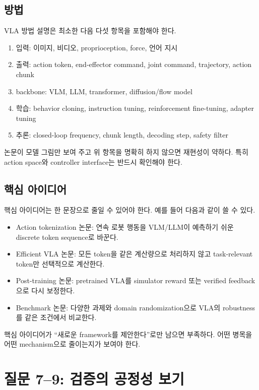 \subsection{방법}

VLA 방법 설명은 최소한 다음 다섯 항목을 포함해야 한다.

\begin{enumerate}
  \item 입력: 이미지, 비디오, proprioception, force, 언어 지시
  \item 출력: action token, end-effector command, joint command, trajectory, action chunk
  \item backbone: VLM, LLM, transformer, diffusion/flow model
  \item 학습: behavior cloning, instruction tuning, reinforcement fine-tuning, adapter tuning
  \item 추론: closed-loop frequency, chunk length, decoding step, safety filter
\end{enumerate}

논문이 모델 그림만 보여 주고 위 항목을 명확히 하지 않으면 재현성이 약하다. 특히 action space와 controller interface는 반드시 확인해야 한다.

\subsection{핵심 아이디어}

핵심 아이디어는 한 문장으로 줄일 수 있어야 한다. 예를 들어 다음과 같이 쓸 수 있다.

\begin{itemize}
  \item Action tokenization 논문: 연속 로봇 행동을 VLM/LLM이 예측하기 쉬운 discrete token sequence로 바꾼다.
  \item Efficient VLA 논문: 모든 token을 같은 계산량으로 처리하지 않고 task-relevant token만 선택적으로 계산한다.
  \item Post-training 논문: pretrained VLA를 simulator reward 또는 verified feedback으로 다시 보정한다.
  \item Benchmark 논문: 다양한 과제와 domain randomization으로 VLA의 robustness를 같은 조건에서 비교한다.
\end{itemize}

핵심 아이디어가 ``새로운 framework를 제안한다''로만 남으면 부족하다. 어떤 병목을 어떤 mechanism으로 줄이는지가 보여야 한다.

\section{질문 7--9: 검증의 공정성 보기}

